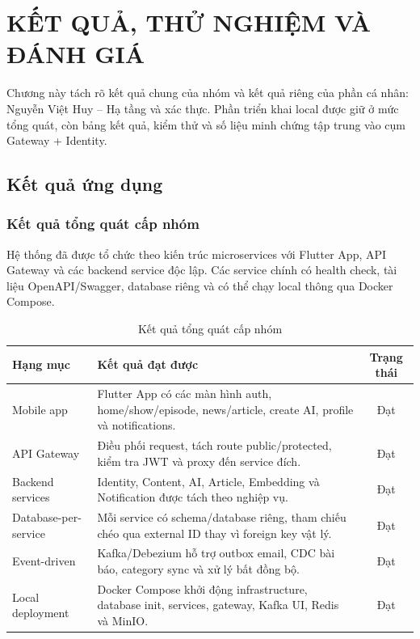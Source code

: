 \documentclass[14pt,a4paper,oneside]{extreport}
\begin{document}
\chapter{KẾT QUẢ, THỬ NGHIỆM VÀ ĐÁNH GIÁ}
\label{chap:ket-qua}

Chương này tách rõ kết quả chung của nhóm và kết quả riêng của phần cá nhân: Nguyễn Việt Huy -- Hạ tầng và xác thực. Phần triển khai local được giữ ở mức tổng quát, còn bảng kết quả, kiểm thử và số liệu minh chứng tập trung vào cụm Gateway + Identity.

\section{Kết quả ứng dụng}
\label{sec:ket-qua-ung-dung}

\subsection{Kết quả tổng quát cấp nhóm}

Hệ thống đã được tổ chức theo kiến trúc microservices với Flutter App, API Gateway và các backend service độc lập. Các service chính có health check, tài liệu OpenAPI/Swagger, database riêng và có thể chạy local thông qua Docker Compose.

\begin{table}[H]
\centering
\caption{Kết quả tổng quát cấp nhóm}
\label{tab:ket-qua-tong-quat}
\renewcommand{\arraystretch}{1.3}
\small
\begin{tabularx}{\textwidth}{|l|X|c|}
\hline
\textbf{Hạng mục} & \textbf{Kết quả đạt được} & \textbf{Trạng thái} \\
\hline
Mobile app & Flutter App có các màn hình auth, home/show/episode, news/article, create AI, profile và notifications. & Đạt \\
\hline
API Gateway & Điều phối request, tách route public/protected, kiểm tra JWT và proxy đến service đích. & Đạt \\
\hline
Backend services & Identity, Content, AI, Article, Embedding và Notification được tách theo nghiệp vụ. & Đạt \\
\hline
Database-per-service & Mỗi service có schema/database riêng, tham chiếu chéo qua external ID thay vì foreign key vật lý. & Đạt \\
\hline
Event-driven & Kafka/Debezium hỗ trợ outbox email, CDC bài báo, category sync và xử lý bất đồng bộ. & Đạt \\
\hline
Local deployment & Docker Compose khởi động infrastructure, database init, services, gateway, Kafka UI, Redis và MinIO. & Đạt \\
\hline
\end{tabularx}
\end{table}
\end{document}
